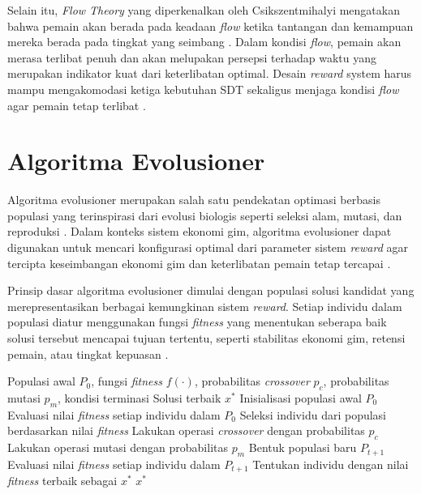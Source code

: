 Selain itu, \textit{Flow Theory} yang diperkenalkan oleh Csikszentmihalyi mengatakan bahwa pemain akan berada pada keadaan \textit{flow} ketika tantangan dan kemampuan mereka berada pada tingkat yang seimbang \citep{2017Inverted}. Dalam kondisi \textit{flow}, pemain akan merasa terlibat penuh dan akan melupakan persepsi terhadap waktu yang merupakan indikator kuat dari keterlibatan optimal. Desain \textit{reward} system harus mampu mengakomodasi ketiga kebutuhan SDT sekaligus menjaga kondisi \textit{flow} agar pemain tetap terlibat \citep{BuilCatalanMartinez2019}.

\section{Algoritma Evolusioner}

Algoritma evolusioner merupakan salah satu pendekatan optimasi berbasis populasi yang terinspirasi dari evolusi biologis seperti seleksi alam, mutasi, dan reproduksi \citep{Herel2022}. Dalam konteks sistem ekonomi gim, algoritma evolusioner dapat digunakan untuk mencari konfigurasi optimal dari parameter sistem \textit{reward} agar tercipta keseimbangan ekonomi gim dan keterlibatan pemain tetap tercapai \citep{MotepalliJacobsen2021}. 

Prinsip dasar algoritma evolusioner dimulai dengan populasi solusi kandidat yang merepresentasikan berbagai kemungkinan sistem \textit{reward}. Setiap individu dalam populasi diatur menggunakan fungsi \textit{fitness} yang menentukan seberapa baik solusi tersebut mencapai tujuan tertentu, seperti stabilitas ekonomi gim, retensi pemain, atau tingkat kepuasan \citep{Bai2024An}. 

\begin{algorithm}[H]
\caption{Kerangka Umum Algoritma Evolusioner untuk Optimasi Sistem \textit{Reward Gim}}
\label{alg:ea-reward}
\begin{algorithmic}[1]
\Require Populasi awal $P_0$, fungsi \textit{fitness} $f(\cdot)$, probabilitas \textit{crossover} $p_c$, probabilitas mutasi $p_m$, kondisi terminasi
\Ensure Solusi terbaik $x^*$
\State Inisialisasi populasi awal $P_0$
\State Evaluasi nilai \textit{fitness} setiap individu dalam $P_0$
    \State Seleksi individu dari populasi berdasarkan nilai \textit{fitness}
    \State Lakukan operasi \textit{crossover} dengan probabilitas $p_c$
    \State Lakukan operasi mutasi dengan probabilitas $p_m$
    \State Bentuk populasi baru $P_{t+1}$
    \State Evaluasi nilai \textit{fitness} setiap individu dalam $P_{t+1}$
\EndWhile
\State Tentukan individu dengan nilai \textit{fitness} terbaik sebagai $x^*$
\State \Return $x^*$
\end{algorithmic}
\end{algorithm}

